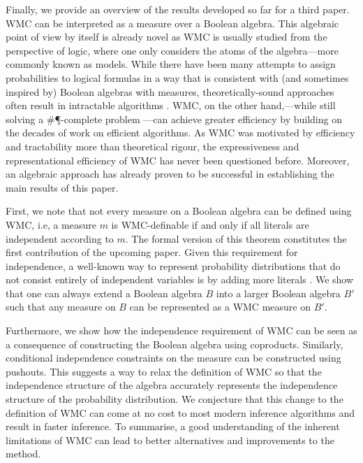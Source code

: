 \documentclass{article}
\begin{document}
Finally, we provide an overview of the results developed so far for a third
paper. WMC can be interpreted as a measure over a Boolean algebra. This
algebraic point of view by itself is already novel as WMC is usually studied
from the perspective of logic, where one only considers the atoms of the
algebra---more commonly known as models. While there have been many attempts to
assign probabilities to logical formulas in a way that is consistent with (and
sometimes inspired by) Boolean algebras with measures, theoretically-sound
approaches often result in intractable algorithms
\cite{DBLP:journals/soco/CastineiraCT02,DBLP:journals/eccc/GarrabrantBCST16,DBLP:journals/ndjfl/Hailperin84,krauss1968representation,DBLP:journals/ai/Nilsson86}.
WMC, on the other hand,---while still solving a \#\P{}-complete problem
\cite{DBLP:conf/aaai/SangBK05}---can achieve greater efficiency by building on
the decades of work on efficient \SAT{} algorithms. As WMC was motivated by
efficiency and tractability more than theoretical rigour, the expressiveness and
representational efficiency of WMC has never been questioned before. Moreover,
an algebraic approach has already proven to be successful in establishing the
main results of this paper.

First, we note that not every measure on a Boolean algebra can be defined using
WMC, i.e, a measure $m$ is WMC-definable if and only if all literals are
independent according to $m$. The formal version of this theorem constitutes the
first contribution of the upcoming paper. Given this requirement for
independence, a well-known way to represent probability distributions that do
not consist entirely of independent variables is by adding more literals
\cite{DBLP:journals/ai/ChaviraD08}. We show that one can always extend a Boolean
algebra $B$ into a larger Boolean algebra $B'$ such that any measure on $B$ can
be represented as a WMC measure on $B'$.

Furthermore, we show how the independence requirement of WMC can be seen as a
consequence of constructing the Boolean algebra using coproducts. Similarly,
conditional independence constraints on the measure can be constructed using
pushouts. This suggests a way to relax the definition of WMC so that the
independence structure of the algebra accurately represents the independence
structure of the probability distribution. We conjecture that this change to the
definition of WMC can come at no cost to most modern inference algorithms and
result in faster inference. To summarise, a good understanding of the inherent
limitations of WMC can lead to better alternatives and improvements to the
method.
\end{document}
